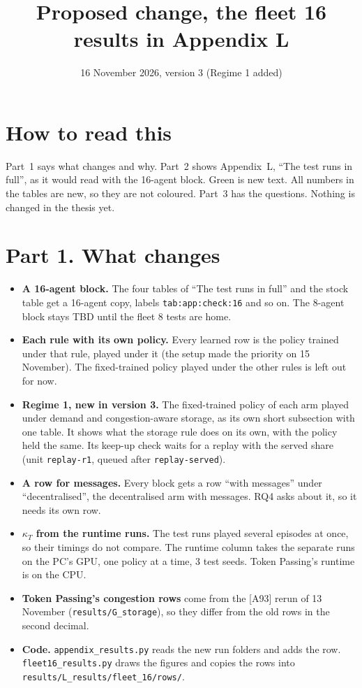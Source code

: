 \documentclass[11pt,a4paper]{article}
\title{Proposed change, the fleet 16 results in Appendix L}
\date{16 November 2026, version 3 (Regime 1 added)}
\newcommand{\new}[1]{\textcolor{newc}{#1}}
\begin{document}
\maketitle

\section*{How to read this}
Part~1 says what changes and why. Part~2 shows Appendix~L, ``The test runs in full'', as it would
read with the 16-agent block. \new{Green} is new text. All numbers in the tables are new, so they are
not coloured. Part~3 has the questions. Nothing is changed in the thesis yet.

\section*{Part 1. What changes}

\begin{itemize}[leftmargin=1.2em]
\item \textbf{A 16-agent block.} The four tables of ``The test runs in full'' and the stock table get a
  16-agent copy, labels \texttt{tab:app:check:16} and so on. The 8-agent block stays TBD until the
  fleet 8 tests are home.
\item \textbf{Each rule with its own policy.} Every learned row is the policy trained under that rule,
  played under it (the setup made the priority on 15 November). The fixed-trained policy played under
  the other rules is left out for now.
\item \textbf{\new{Regime 1, new in version 3.}} \new{The fixed-trained policy of each arm played under
  demand and congestion-aware storage, as its own short subsection with one table. It shows what the
  storage rule does on its own, with the policy held the same. Its keep-up check waits for a replay
  with the served share (unit \texttt{replay-r1}, queued after \texttt{replay-served}).}
\item \textbf{A row for messages.} Every block gets a row ``with messages'' under ``decentralised'',
  the decentralised arm with messages. RQ4 asks about it, so it needs its own row.
\item \textbf{$\kappa_T$ from the runtime runs.} The test runs played several episodes at once, so
  their timings do not compare. The runtime column takes the separate runs on the PC's GPU, one policy
  at a time, 3 test seeds. Token Passing's runtime is on the CPU.
\item \textbf{Token Passing's congestion rows} come from the [A93] rerun of 13 November
  (\texttt{results/G\_storage}), so they differ from the old rows in the second decimal.
\item \textbf{Code.} \texttt{appendix\_results.py} reads the new run folders and adds the row.
  \texttt{fleet16\_results.py} draws the figures and copies the rows into
  \texttt{results/L\_results/fleet\_16/rows/}.
\end{itemize}
\end{document}
